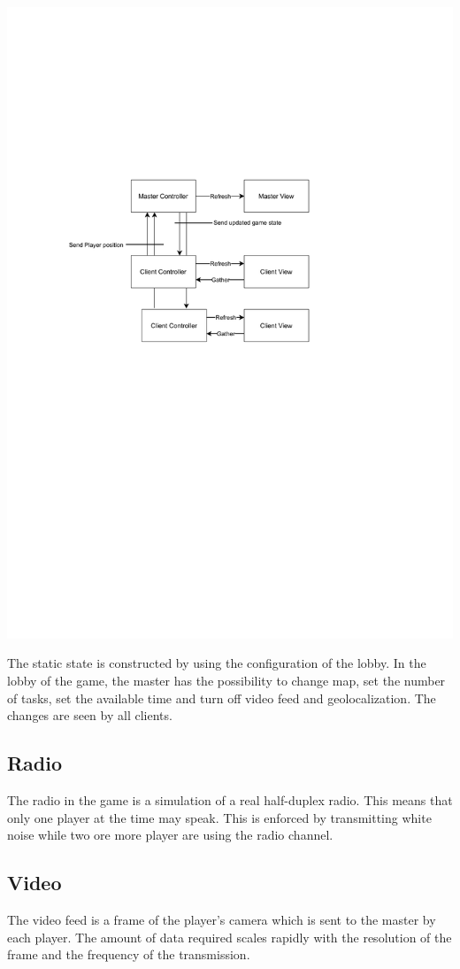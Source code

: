 \documentclass{article}
\begin{document}
\smallskip
\includegraphics[width=\textwidth]{net architecture}

\smallskip
The static state is constructed by using the configuration of the lobby. In the lobby of the game, the master has the possibility to change map, set the number of tasks, set the available time and  turn off video feed and geolocalization. The changes are seen by all clients.

\subsection{Radio}
The radio in the game is a simulation of a real half-duplex radio. This means that only one player at the time may speak. This is enforced by transmitting white noise while two ore more player are using the radio channel.
\subsection{Video}
The video feed is a frame of the player's camera which is sent to the master by each player. The amount of data required scales rapidly with the resolution of the frame and the frequency of the transmission.
\end{document}
